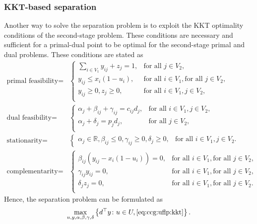 \subsubsection{KKT-based separation}

Another way to solve the separation problem is to exploit the KKT optimality
conditions of the second-stage problem. These conditions are necessary and
sufficient for a primal-dual point to be optimal for the second-stage primal
and dual problems. These conditions are stated as 
\begin{equation}
    \label{eq:ccg:uflp:kkt}
    \begin{aligned}
        \text{primal feasibility} = & 
        \begin{cases}
            \sum_{i\in V_1} y_{ij} + z_j = 1, & \text{for all } j\in V_2, \\
            y_{ij} \le x_i(1 - u_i), & \text{for all } i\in V_1, \text{for all } j\in V_2,  \\
            y_{ij}\ge 0, z_j \ge 0, & \text{for all } i\in V_1, j\in V_2, \\
        \end{cases} \\
        \text{dual feasibility} = & 
        \begin{cases}
            \alpha_j + \beta_{ij} + \gamma_{ij} = c_{ij}d_j, & \text{for all }i\in V_1, j\in V_2, \\
            \alpha_j + \delta_j = p_jd_j, & \text{for all } j\in V_2, \\
        \end{cases} \\
        \text{stationarity} = &
        \begin{cases}
            \alpha_j\in\mathbb{R}, \beta_{ij} \le 0, \gamma_{ij} \ge 0, \delta_j \ge 0, & \text{for all } i\in V_1, j\in V_2.
        \end{cases} \\
        \text{complementarity} = & 
        \begin{cases}
            \beta_{ij}(y_{ij} - x_i(1 - u_i)) = 0, & \text{for all } i\in V_1, \text{for all } j\in V_2, \\
            \gamma_{ij}y_{ij} = 0, & \text{for all } i\in V_1, \text{for all } j\in V_2, \\
            \delta_jz_j = 0, & \text{for all } i\in V_1, \text{for all } j\in V_2. \\
        \end{cases}
    \end{aligned}
\end{equation}
Hence, the separation problem can be formulated as 
\begin{align*}
    \max_{u,y,\alpha,\beta,\gamma,\delta} \left\{ d^\top y \colon u\in U, \eqref{eq:ccg:uflp:kkt} \right\}.
\end{align*}

